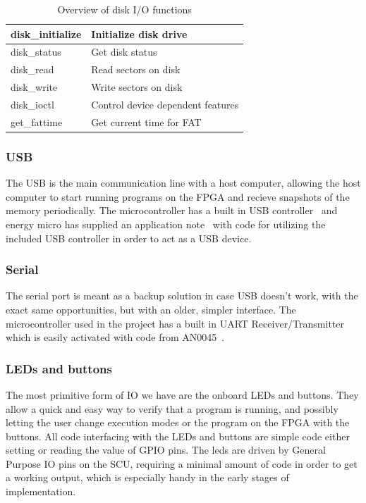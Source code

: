 \begin{table}[H]
    \begin{tabular}{| l | l |}
        \hline
        disk\_initialize & Initialize disk drive \\
        \hline
        disk\_status & Get disk status \\
        \hline
        disk\_read & Read sectors on disk \\
        \hline
        disk\_write & Write sectors on disk \\
        \hline
        disk\_ioctl & Control device dependent features \\
        \hline
        get\_fattime & Get current time for FAT \\
        \hline
    \end{tabular}
    \caption{Overview of disk I/O functions}
\end{table}

\subsubsection{USB}
The USB is the main communication line with a host computer, allowing the host computer to start running programs on the FPGA and recieve snapshots of the memory periodically.
The microcontroller has a built in USB controller~\cite{efm32gg990-datasheet} and energy micro has supplied an application note~\cite{an0065} with code for utilizing the included USB controller in order to act as a USB device.

\subsubsection{Serial}
The serial port is meant as a backup solution in case USB doesn't work, with the exact same opportunities, but with an older, simpler interface.
The microcontroller used in the project has a built in UART Receiver/Transmitter\cite{efm32gg990-datasheet} which is easily activated with code from AN0045~\cite{an0045}.

\subsubsection{LEDs and buttons}
The most primitive form of IO we have are the onboard LEDs and buttons.
They allow a quick and easy way to verify that a program is running, and possibly letting the user change execution modes or the program on the FPGA with the buttons.
All code interfacing with the LEDs and buttons are simple code either setting or reading the value of GPIO pins.
The leds are driven by General Purpose IO pins on the SCU, requiring a minimal amount of code in order to get a working output, which is especially handy in the early stages of implementation.

